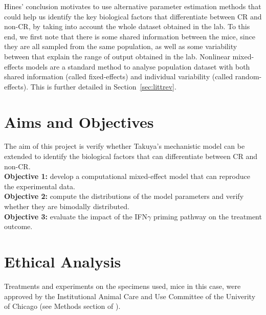\documentclass[11pt]{article}
\begin{document}
Hines' conclusion motivates to use alternative parameter estimation methods that could help us identify the key biological factors that differentiate between CR and non-CR, by taking into account the whole dataset obtained in the lab. To this end, we first note that there is some shared information between the mice, since they are all sampled from the same population, as well as some variability between that explain the range of output obtained in the lab. Nonlinear mixed-effects models \cite{Davidian2011} are a standard method to analyse population dataset with both shared information (called fixed-effects) and individual variability (called random-effects). This is further detailed in Section~\ref{sec:littrev}.

\section{Aims and Objectives}
\noindent The aim of this project is verify whether Takuya's mechanistic model can be extended to identify the biological factors that can differentiate between CR and non-CR.\\[8pt]
\textbf{Objective 1:} develop a computational mixed-effect model that can reproduce the experimental data.\\ 
\textbf{Objective 2:} compute the distributions of the model parameters and verify whether they are bimodally distributed.\\ 
\textbf{Objective 3:} evaluate the impact of the IFN$\gamma$ priming pathway on the treatment outcome. 

\section{Ethical Analysis}

Treatments and experiments on the specimens used, mice in this case, were approved by the Institutional Animal Care and Use Committee of the Univerity of Chicago (see Methods section of \cite{cbdil12}).
\end{document}
